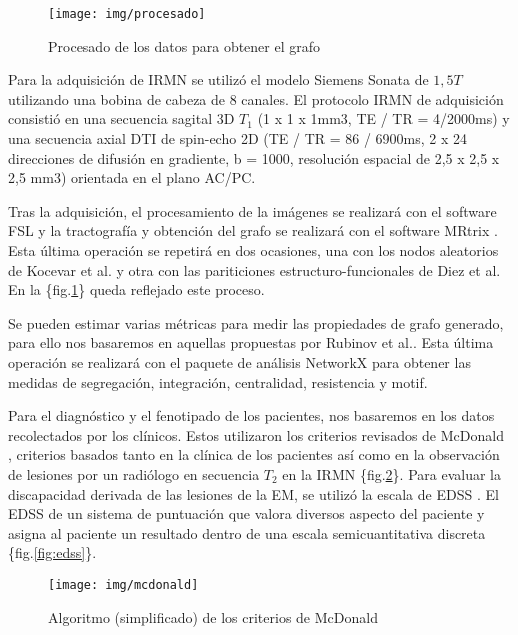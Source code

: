 \documentclass[fleqn,12pt]{UICArticle} %
\begin{document}
\begin{figure}[h]
	\centering
	\texttt{[image: img/procesado]}
	\vspace{5mm} 
	\caption{Procesado de los datos para obtener el grafo}
	\label{fig:pipeline}
\end{figure}


Para la adquisición de IRMN se utilizó el modelo Siemens Sonata de $1,5T$ utilizando una bobina de cabeza de $8$ canales. El protocolo IRMN de adquisición consistió en una secuencia sagital 3D $T_1$ (1 x 1 x 1mm3, TE / TR = 4/2000ms) y una secuencia axial DTI de spin-echo 2D (TE / TR = 86 / 6900ms, 2 x 24 direcciones de difusión en gradiente, b = 1000, resolución espacial de 2,5 x 2,5 x 2,5 mm3) orientada en el plano AC/PC.

Tras la adquisición, el procesamiento de la imágenes se realizará con el software FSL \cite{Jenkinson2012} y la tractografía y obtención del grafo se realizará con el software MRtrix \cite{Tournier2012}. Esta última operación se repetirá en dos ocasiones, una con los nodos aleatorios de Kocevar et al. y otra con las pariticiones estructuro-funcionales de Diez et al. En la \{fig.\ref{fig:pipeline}\} queda reflejado este proceso.

Se pueden estimar varias métricas para medir las propiedades de grafo generado, para ello nos basaremos en aquellas propuestas por Rubinov et al.\cite{Rubinov2010}. Esta última operación se realizará con el paquete de análisis NetworkX \cite{Daducci2012} para obtener las medidas de segregación, integración, centralidad, resistencia y motif.


Para el diagnóstico y el fenotipado de los pacientes, nos basaremos en los datos recolectados por los clínicos. Estos utilizaron los criterios revisados de McDonald \cite{Mcdonald2001, Polman2011}, criterios basados tanto en la clínica de los pacientes así como en la observación de lesiones por un radiólogo en secuencia $T_2$ en la IRMN \{fig.\ref{fig:mcdonald}\}.  Para evaluar la discapacidad derivada de las lesiones de la EM, se utilizó la escala de EDSS \cite{Kurtzke1983}. El EDSS de un sistema de puntuación que valora diversos aspecto del paciente y asigna al paciente un resultado dentro de una escala semicuantitativa discreta \{fig.\ref{fig:edss}\}.

\begin{figure}[b]
	\centering
	\texttt{[image: img/mcdonald]}
	\vspace{5mm} 
	\caption{Algoritmo (simplificado) de los criterios de McDonald}
	\label{fig:mcdonald}
\end{figure}
\end{document}
